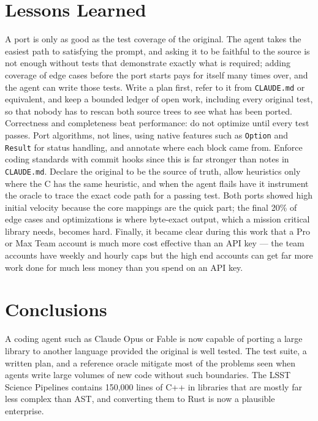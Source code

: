 \documentclass[11pt,twoside]{article}
\begin{document}
\section{Lessons Learned}

A port is only as good as the test coverage of the original.
The agent takes the easiest path to satisfying the prompt, and asking it to be faithful to the source is not enough without tests that demonstrate exactly what is required; adding coverage of edge cases before the port starts pays for itself many times over, and the agent can write those tests.
Write a plan first, refer to it from \texttt{CLAUDE.md} or equivalent, and keep a bounded ledger of open work, including every original test, so that nobody has to rescan both source trees to see what has been ported.
Correctness and completeness beat performance: do not optimize until every test passes.
Port algorithms, not lines, using native features such as \texttt{Option} and \texttt{Result} for status handling, and annotate where each block came from.
Enforce coding standards with commit hooks since this is far stronger than notes in \texttt{CLAUDE.md}.
Declare the original to be the source of truth, allow heuristics only where the C has the same heuristic, and when the agent flails have it instrument the oracle to trace the exact code path for a passing test.
Both ports showed high initial velocity because the core mappings are the quick part; the final 20\% of edge cases and optimizations is where byte-exact output, which a mission critical library needs, becomes hard.
Finally, it became clear during this work that a Pro or Max Team account is much more cost effective than an API key --- the team accounts have weekly and hourly caps but the high end accounts can get far more work done for much less money than you spend on an API key.

\section{Conclusions}

A coding agent such as Claude Opus or Fable is now capable of porting a large library to another language provided the original is well tested.
The test suite, a written plan, and a reference oracle mitigate most of the problems seen when agents write large volumes of new code without such boundaries.
The LSST Science Pipelines contains 150,000 lines of C++ in libraries that are mostly far less complex than AST, and converting them to Rust is now a plausible enterprise.
\end{document}
